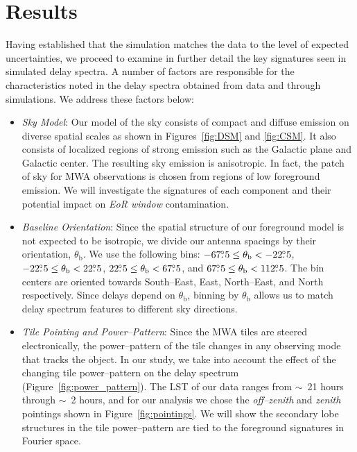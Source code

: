 \documentclass[preprint2,iop,numberedappendix]{emulateapj}
\begin{document}
\section{Results}\label{sec:delay-spectrum-analysis}

Having established that the simulation matches the data to the level of expected uncertainties, we proceed to examine in further detail the key signatures seen in simulated delay spectra. A number of factors are responsible for the characteristics noted in the delay spectra obtained from data and through simulations. We address these factors below: 

\begin{itemize}

\item {\it Sky Model}: Our model of the sky consists of compact and diffuse emission on diverse spatial scales as shown in Figures~\ref{fig:DSM} and \ref{fig:CSM}. It also consists of localized regions of strong emission such as the Galactic plane and Galactic center. The resulting sky emission is anisotropic. In fact, the patch of sky for MWA observations is chosen from regions of low foreground emission. We will investigate the signatures of each component and their potential impact on {\it EoR window} contamination.

\item {\it Baseline Orientation}: Since the spatial structure of our foreground model is not expected to be isotropic, we divide our antenna spacings by their orientation, $\theta_\textrm{b}$. We use the following bins: $-67\mbox{$.\!\!^\circ$} 5\le \theta_\textrm{b} < -22\mbox{$.\!\!^\circ$} 5$, $-22\mbox{$.\!\!^\circ$} 5\le \theta_\textrm{b} < 22\mbox{$.\!\!^\circ$} 5$, $22\mbox{$.\!\!^\circ$} 5\le \theta_\textrm{b} < 67\mbox{$.\!\!^\circ$} 5$, and $67\mbox{$.\!\!^\circ$} 5\le \theta_\textrm{b} < 112\mbox{$.\!\!^\circ$} 5$. The bin centers are oriented towards South--East, East, North--East, and North respectively. Since delays depend on $\theta_\textrm{b}$, binning by $\theta_\textrm{b}$ allows us to match delay spectrum features to different sky directions.

\item {\it Tile Pointing and Power--Pattern}: Since the MWA tiles are steered electronically, the power--pattern of the tile changes in any observing mode that tracks the object. In our study, we take into account the effect of the changing tile power--pattern on the delay spectrum (Figure~\ref{fig:power_pattern}). The LST of our data ranges from $\sim$~21 hours through $\sim$~2 hours, and for our analysis we chose the {\it off--zenith} and {\it zenith} pointings shown in Figure~\ref{fig:pointings}. We will show the secondary lobe structures in the tile power--pattern are tied to the foreground signatures in Fourier space. 


\end{itemize}
\end{document}
